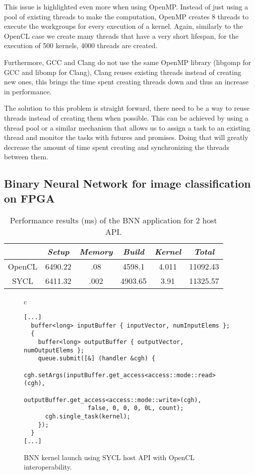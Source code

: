 \documentclass[sigplan]{acmart}
\begin{document}
This issue is highlighted even more when using OpenMP. Instead of just using
a pool of existing threads to make the computation, OpenMP creates 8 threads
to execute the workgroups for every execution of a kernel. Again, similarly to
the OpenCL case we create many threads that have a very short lifespan,
for the execution of 500 kernels, 4000 threads are created.

Furthermore, GCC and Clang do not use the same OpenMP library (libgomp for GCC 
and libomp for Clang), Clang reuses existing threads instead of creating new 
ones, this brings the time spent creating threads down and thus an increase
in performance.

The solution to this problem is straight forward, there need to be a way to
reuse threads instead of creating them when possible. This can be achieved
by using a thread pool or a similar mechanism that allows us to assign a task
to an existing thread and monitor the tasks with futures and promises.
Doing that will greatly decrease the amount of time spent creating and
synchronizing the threads between them.


\subsection{Binary Neural Network for image classification on FPGA}
\label{sec:example-from-ken}

\begin{table}
  \caption{Performance results (ms) of the BNN application for 2 host
    API.}
  \begin{tabular}{|c|c|c|c|c|c|}
    \cline{2-6}
    \multicolumn{1}{c|}{}&   \textit{Setup}      & \textit{Memory} & \textit{Build}  & \textit{Kernel} & \textit{Total} \\\hline
    OpenCL& 6490.22     &     .08& 4598.1   & 4.011 &11092.43 \\\hline
    SYCL  & 6411.32     & .002   & 4903.65  & 3.91  &11325.57 \\\hline
  \end{tabular}
  \label{tbl:perfbnn}
\end{table}

\begin{figure*}
  \begin{tabular}{c}
    \begin{lstlisting}[basicstyle=\scriptsize]
[...]
  buffer<long> inputBuffer { inputVector, numInputElems };
  {
    buffer<long> outputBuffer { outputVector, numOutputElems };
    queue.submit([&] (handler &cgh) {
      cgh.setArgs(inputBuffer.get_access<access::mode::read>(cgh),
                  outputBuffer.get_access<access::mode::write>(cgh),
                  false, 0, 0, 0, 0L, count);
      cgh.single_task(kernel);
    });
  }
[...]
\end{lstlisting}
\end{tabular}
\caption{BNN kernel launch using SYCL host API with OpenCL interoperability.}
\label{fig:syclbnn}
\end{figure*}
\end{document}
